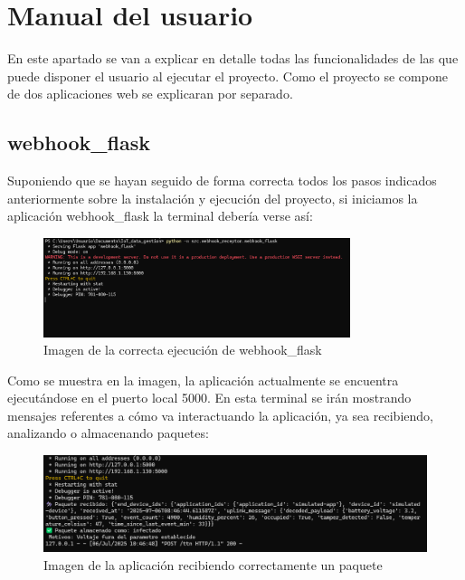 \section{Manual del usuario}
En este apartado se van a explicar en detalle todas las funcionalidades de las que puede disponer el usuario al ejecutar el proyecto. Como el proyecto se compone de dos aplicaciones web se explicaran por separado.


\subsection{webhook\_flask}

Suponiendo que se hayan seguido de forma correcta todos los pasos indicados anteriormente sobre la instalación y ejecución del proyecto, si iniciamos la aplicación webhook\_flask la terminal debería verse así:

\begin{figure}[h]
    \centering
    \includegraphics[width=0.8\textwidth]{img/webhook_flask.png} 
    \caption{Imagen de la correcta ejecución de webhook\_flask}
    \label{fig:E1}
\end{figure}

Como se muestra en la imagen, la aplicación actualmente se encuentra ejecutándose en el puerto local 5000. En esta terminal se irán mostrando mensajes referentes a cómo va interactuando la aplicación, ya sea recibiendo, analizando o almacenando paquetes:


\begin{figure}[h]
    \centering
    \includegraphics[width=1.2\textwidth]{img/paquete_recibido.png} 
    \caption{Imagen de la aplicación recibiendo correctamente un paquete}
    \label{fig:E2}
\end{figure}

